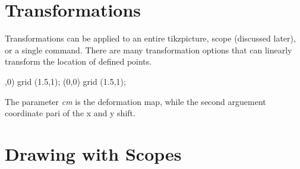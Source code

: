 \documentclass{../../ExampleProblem}
\begin{document}
\section{Transformations}

\begin{paracol}{2}
Transformations can be applied to an entire tikzpicture, scope (discussed later), or a single command. There are many transformation options that can linearly transform the location of defined points.

\centering
\begin{latexcode}
,0) grid (1.5,1);
\draw[cm={1.667,0.4,0.267,1.3,(0,0)},
      step=0.1] 
      (0,0) grid (1.5,1);
\end{latexcode}

The parameter \textit{cm} is the deformation map, while the second arguement coordinate pari of the x and y shift.

\switchcolumn


\end{paracol}




\section{Drawing with Scopes}

\end{document}
